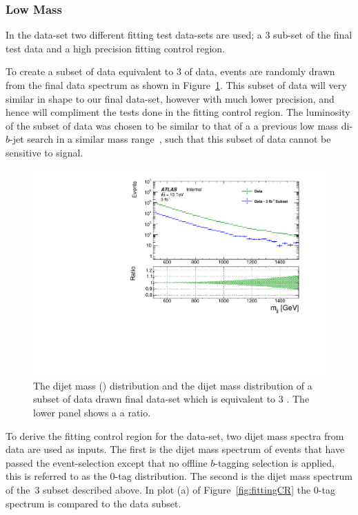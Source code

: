 \subsubsection{Low Mass}
\label{sec:lowmass_bkgsample}

In the \lm{} data-set two different fitting test data-sets are used;
a 3 \ifb{} sub-set of the final test data and a high precision fitting control region.

To create a subset of data equivalent to 3 \ifb{} of data,
events are randomly drawn from the final data spectrum as shown in Figure~\ref{fig:fittingDataSubset}.
This subset of data will very similar in shape to our final data-set, however with much lower precision,
and hence will compliment the tests done in the fitting control region.
The luminosity of the subset of data was chosen to be similar to that of a
a previous low mass di-$b$-jet search in a similar mass range~\cite{dibjet-lhcp_conf},
such that  this subset of data cannot be sensitive to signal.

\begin{figure}[!htb]
\captionsetup[subfigure]{aboveskip=0pt,justification=centering}
\centering
\includegraphics[width=0.45\linewidth, angle=0]{figs/Dibjet/LowMass/FitStudy/subset_dataComp.pdf}
\vspace{10pt}
\caption{\label{fig:fittingDataSubset}
  The \lm{} dijet mass (\mjj{}) distribution and the dijet mass distribution of a subset of data drawn final data-set which is equivalent to 3 \ifb{}.
  The lower panel shows a a ratio.}
\end{figure}

To derive the fitting control region for the \lm{} data-set,
two dijet mass spectra from data are used as inputs.
The first is the dijet mass spectrum of events that have passed the \lm{} event-selection
except that no offline $b$-tagging selection is applied, this is referred to as the 0-tag distribution.
The second is the dijet mass spectrum of the~3 \ifb{} subset described above.
In plot (a) of Figure~\ref{fig:fittingCR} the 0-tag spectrum is compared to the data subset.

